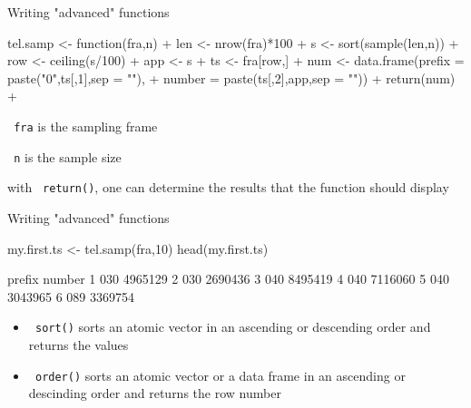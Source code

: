 \documentclass[11pt,german,hideothersubsections]{beamer}
\newcommand{\R}[1]{{\tt \color{blue}  #1}}
\begin{document}
\begin{frame}[fragile]{Writing "advanced" functions}
\footnotesize{
\begin{Schunk}
\begin{Sinput}
 tel.samp <- function(fra,n){
+   len <- nrow(fra)*100
+   s <- sort(sample(len,n))
+   row <- ceiling(s/100)
+   app <- s%
+   ts <- fra[row,]
+   num <- data.frame(prefix = paste("0",ts[,1],sep = ""),
+                     number = paste(ts[,2],app,sep = ""))
+   return(num)
+ }
\end{Sinput}
\end{Schunk}
}

\begin{itemize}\footnotesize{
\item \R{fra} is the sampling frame
\item \R{n} is the sample size
\item with \R{return()}, one can determine the results that the function should display
}
\end{itemize}

\end{frame}
\begin{frame}[fragile]{Writing "advanced" functions}
\footnotesize{
\begin{Schunk}
\begin{Sinput}
 my.first.ts <- tel.samp(fra,10)
 head(my.first.ts)
\end{Sinput}
\begin{Soutput}
  prefix  number
1    030 4965129
2    030 2690436
3    040 8495419
4    040 7116060
5    040 3043965
6    089 3369754
\end{Soutput}
\end{Schunk}
}

\vspace{.25cm}
\begin{itemize}
\item \R{sort()} sorts an atomic vector in an ascending or descending order and returns the values
\item \R{order()} sorts an atomic vector or a data frame in an ascending or descinding order and returns the row number
\end{itemize}
\end{frame}
\end{document}
